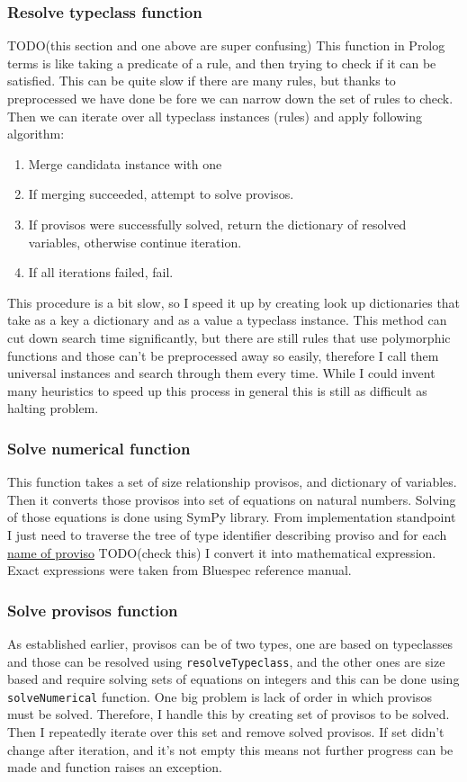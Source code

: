 \documentclass[14pt]{report}
\begin{document}
\subsubsection{Resolve typeclass function}
TODO(this section and one above are super confusing)
This function in Prolog terms is like taking a predicate of a rule, and then trying to check if it can be satisfied. This can be quite slow if there are many rules, but thanks to preprocessed we have done be fore we can narrow down the set of rules to check.
Then we can iterate over all typeclass instances (rules) and apply following algorithm:
\begin{enumerate} 
    \item Merge candidata instance with one 
    \item If merging succeeded, attempt to solve provisos.
    \item If provisos were successfully solved, return the dictionary of resolved variables, otherwise continue iteration.
    \item If all iterations failed, fail.
\end{enumerate}
This procedure is a bit slow, so I speed it up by creating look up dictionaries that take as a key a dictionary and as a value a typeclass instance. This method can cut down search time significantly, but there are still rules that use polymorphic functions and those can't be preprocessed away so easily, therefore I call them universal instances and search through them every time. While I could invent many heuristics to speed up this process in general this is still as difficult as halting problem.

\subsubsection{Solve numerical function}
This function takes a set of size relationship provisos, and dictionary of variables. Then it converts those provisos into set of equations on natural numbers. Solving of those equations is done using SymPy library.
From implementation standpoint I just need to traverse the tree of type identifier describing proviso and for each \hyperref[sec:Provisos]{name of proviso} TODO(check this) I convert it into mathematical expression. Exact expressions were taken from Bluespec reference manual.

\subsubsection{Solve provisos function}
As established earlier, provisos can be of two types, one are based on typeclasses and those can be resolved using \verb!resolveTypeclass!, and the other ones are size based and require solving sets of equations on integers and this can be done using \verb!solveNumerical! function.
One big problem is lack of order in which provisos must be solved. Therefore, I handle this by creating set of provisos to be solved. Then I repeatedly iterate over this set and remove solved provisos. If set didn't change after iteration, and it's not empty this means not further progress can be made and function raises an exception.
\end{document}
